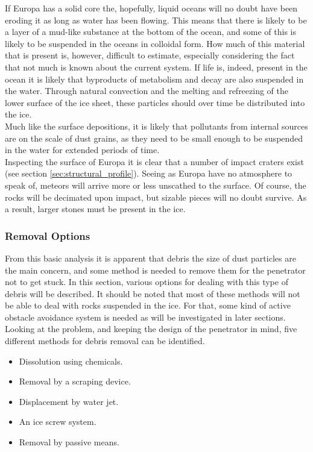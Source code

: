 \noindent
If Europa has a solid core the, hopefully, liquid oceans will no doubt have been eroding it as long as water has been flowing. This means that there is likely to be a layer of a mud-like substance at the bottom of the ocean, and some of this is likely to be suspended in the oceans in colloidal form. How much of this material that is present is, however, difficult to estimate, especially considering the fact that not much is known about the current system. If life is, indeed, present in the ocean it is likely that byproducts of metabolism and decay are also suspended in the water. Through natural convection and the melting and refreezing of the lower surface of the ice sheet, these particles should over time be distributed into the ice. \\
Much like the surface depositions, it is likely that pollutants from internal sources are on the scale of dust grains, as they need to be small enough to be suspended in the water for extended periods of time.\\

\noindent
Inspecting the surface of Europa it is clear that a number of impact craters exist (see section \ref{sec:structural_profile}). Seeing as Europa have no atmosphere to speak of, meteors will arrive more or less unscathed to the surface. Of course, the rocks will be decimated upon impact, but sizable pieces will no doubt survive. As a result, larger stones must be present in the ice.  \\

\subsubsection{Removal Options}
From this basic analysis it is apparent that debris the size of dust particles are the main concern, and some method is needed to remove them for the penetrator not to get stuck. In this section, various options for dealing with this type of debris will be described. It should be noted that most of these methods will not be able to deal with rocks suspended in the ice. For that, some kind of active obstacle avoidance system is needed as will be investigated in later sections.\\

\noindent
Looking at the problem, and keeping the design of the penetrator in mind, five different methods for debris removal can be identified.
\begin{itemize}
	\item Dissolution using chemicals.
	\item Removal by a scraping device.
	\item Displacement by water jet.
	\item An ice screw system.
	\item Removal by passive means.
\end{itemize}

